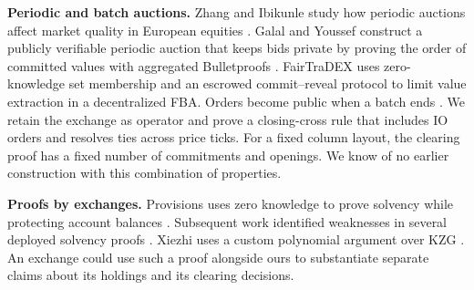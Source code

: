 \textbf{Periodic and batch auctions.} Zhang and Ibikunle study how periodic auctions affect market quality in European equities \cite{zhang2023}. Galal and Youssef construct a publicly verifiable periodic auction that keeps bids private by proving the order of committed values with aggregated Bulletproofs \cite{bulletproofs2018,galal2021}. FairTraDEX uses zero-knowledge set membership and an escrowed commit--reveal protocol to limit value extraction in a decentralized FBA. Orders become public when a batch ends \cite{fairtradex2022}. We retain the exchange as operator and prove a closing-cross rule that includes IO orders and resolves ties across price ticks. For a fixed column layout, the clearing proof has a fixed number of commitments and openings. We know of no earlier construction with this combination of properties.

\textbf{Proofs by exchanges.} Provisions uses zero knowledge to prove solvency while protecting account balances \cite{provisions2015}. Subsequent work identified weaknesses in several deployed solvency proofs \cite{chalkias2022}. Xiezhi uses a custom polynomial argument over KZG \cite{xiezhi2026}. An exchange could use such a proof alongside ours to substantiate separate claims about its holdings and its clearing decisions.
